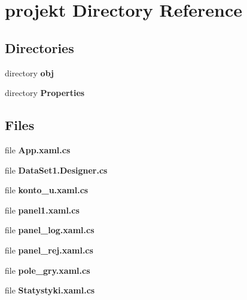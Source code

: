 \section{projekt Directory Reference}
\label{dir_1f93d54fad99c643cd6a135dfed94bed}
\subsection*{Directories}
\begin{DoxyCompactItemize}
\item 
directory \textbf{ obj}
\item 
directory \textbf{ Properties}
\end{DoxyCompactItemize}
\subsection*{Files}
\begin{DoxyCompactItemize}
\item 
file \textbf{ App.\+xaml.\+cs}
\item 
file \textbf{ Data\+Set1.\+Designer.\+cs}
\item 
file \textbf{ konto\+\_\+u.\+xaml.\+cs}
\item 
file \textbf{ panel1.\+xaml.\+cs}
\item 
file \textbf{ panel\+\_\+log.\+xaml.\+cs}
\item 
file \textbf{ panel\+\_\+rej.\+xaml.\+cs}
\item 
file \textbf{ pole\+\_\+gry.\+xaml.\+cs}
\item 
file \textbf{ Statystyki.\+xaml.\+cs}
\end{DoxyCompactItemize}
